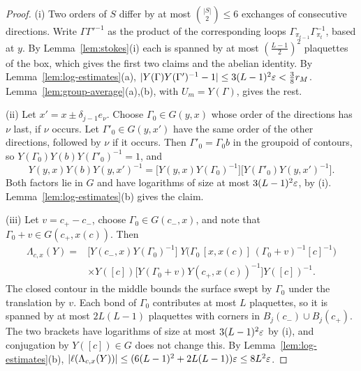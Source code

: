 \begin{proof}
(i) Two orders of $S$ differ by at most $\binom{|S|}2\le6$ exchanges of consecutive directions. Write $\Gamma\Gamma'^{-1}$ as the product of the corresponding loops $\Gamma_{\pi_{t-1}}\Gamma_{\pi_t}^{-1}$, based at $y$. By Lemma~\ref{lem:stokes}(i) each is spanned by at most $(\frac{L-1}2)^2$ plaquettes of the box, which gives the first two claims and the abelian identity. By Lemma~\ref{lem:log-estimates}(a), $|Y(\Gamma)Y(\Gamma')^{-1}-1|\le3(L-1)^2\varepsilon<\frac38r_M$. Lemma~\ref{lem:group-average}(a),(b), with $U_m=Y(\Gamma)$, gives the rest.

(ii) Let $x'=x\pm\delta_{j-1}e_\nu$. Choose $\Gamma_0\in G(y,x)$ whose order of the directions has $\nu$ last, if $\nu$ occurs. Let $\Gamma'_0\in G(y,x')$ have the same order of the other directions, followed by $\nu$ if it occurs. Then $\Gamma'_0=\Gamma_0b$ in the groupoid of contours, so $Y(\Gamma_0)Y(b)Y(\Gamma'_0)^{-1}=1$, and
\[
Y(y,x)Y(b)Y(y,x')^{-1}=\big[Y(y,x)Y(\Gamma_0)^{-1}\big]\big[Y(\Gamma'_0)Y(y,x')^{-1}\big].
\]
Both factors lie in $G$ and have logarithms of size at most $3(L-1)^2\varepsilon$, by (i). Lemma~\ref{lem:log-estimates}(b) gives the claim.

(iii) Let $v=c_+-c_-$, choose $\Gamma_0\in G(c_-,x)$, and note that $\Gamma_0+v\in G(c_+,x(c))$. Then
\[
\begin{aligned}
\Lambda_{c,x}(Y)={}&\big[Y(c_-,x)Y(\Gamma_0)^{-1}\big]\;Y\big(\Gamma_0\,[x,x(c)]\,(\Gamma_0+v)^{-1}[c]^{-1}\big)\\
&\times Y([c])\big[Y(\Gamma_0+v)Y(c_+,x(c))^{-1}\big]Y([c])^{-1}.
\end{aligned}
\]
The closed contour in the middle bounds the surface swept by $\Gamma_0$ under the translation by $v$. Each bond of $\Gamma_0$ contributes at most $L$ plaquettes, so it is spanned by at most $2L(L-1)$ plaquettes with corners in $B_j(c_-)\cup B_j(c_+)$. The two brackets have logarithms of size at most $3(L-1)^2\varepsilon$ by (i), and conjugation by $Y([c])\in G$ does not change this. By Lemma~\ref{lem:log-estimates}(b), $|\ell(\Lambda_{c,x}(Y))|\le(6(L-1)^2+2L(L-1))\varepsilon\le8L^2\varepsilon$.


\end{proof}
